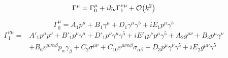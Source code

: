 \documentclass{article}
\begin{document}
\begin{equation}
	\Gamma^\mu = \Gamma_0^\mu + ik_\nu \Gamma_1^{\nu\mu} + \order{k^2}
\end{equation}

\begin{equation*}
	\Gamma^\mu_0 = A_1 p^\mu + B_1 \gamma^\mu + D_1 \gamma^\mu \gamma^5 + iE_1 p^\mu \gamma^5
\end{equation*}
\begin{align*}
	\Gamma^{\nu\mu}_1 = &A'_1 p^\mu p^\nu + B'_1 p^\nu\gamma^\mu + D'_1p^\nu \gamma^\mu \gamma^5 + iE'_1 p^\nu p^\mu \gamma^5 + A_2 g^{\mu\nu} + B_3 p^\mu\gamma^\nu\\& + B_6 \varepsilon^{\mu\nu\alpha\beta}p_\alpha \gamma_\beta + C_2 \sigma^{\mu\nu} + C_{10}\varepsilon^{\mu\nu\alpha\beta} \sigma_{\alpha\beta} + D_3 p^\mu \gamma^\nu\gamma^5 + iE_2 g^{\mu\nu} \gamma^5
\end{align*}
\end{document}
